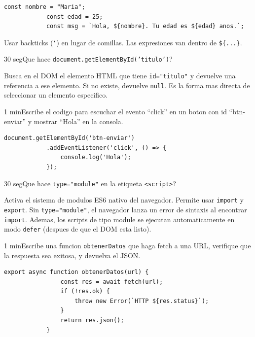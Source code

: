\documentclass[11pt,a4paper]{article}
\newcounter{nej}
\newcommand{\ej}[2]{%
	\stepcounter{nej}%
	\begin{ejercicio}{\arabic{nej}}{#1}#2\end{ejercicio}\vspace{4pt}}
\begin{document}
	\begin{respuesta}
		\begin{lstlisting}[style=codejs]
			const nombre = "Maria";
			const edad = 25;
			const msg = `Hola, ${nombre}. Tu edad es ${edad} anos.`;
		\end{lstlisting}
		Usar backticks (\texttt{`}) en lugar de comillas. Las expresiones van dentro de \texttt{\$\{...\}}.
	\end{respuesta}
	\vspace{6pt}
	
	\ej{30 seg}{Que hace \texttt{document.getElementById('titulo')}?}
	
	\begin{respuesta}
		Busca en el DOM el elemento HTML que tiene \texttt{id="titulo"} y devuelve una referencia a ese elemento. Si no existe, devuelve \texttt{null}. Es la forma mas directa de seleccionar un elemento especifico.
	\end{respuesta}
	\vspace{6pt}
	
	\ej{1 min}{Escribe el codigo para escuchar el evento ``click'' en un boton con id ``btn-enviar'' y mostrar ``Hola'' en la consola.}
	
	\begin{respuesta}
		\begin{lstlisting}[style=codejs]
			document.getElementById('btn-enviar')
			.addEventListener('click', () => {
				console.log('Hola');
			});
		\end{lstlisting}
	\end{respuesta}
	\vspace{6pt}
	
	\ej{30 seg}{Que hace \texttt{type="module"} en la etiqueta \texttt{<script>}?}
	
	\begin{respuesta}
		Activa el sistema de modulos ES6 nativo del navegador. Permite usar \texttt{import} y \texttt{export}. Sin \texttt{type="module"}, el navegador lanza un error de sintaxis al encontrar \texttt{import}. Ademas, los scripts de tipo module se ejecutan automaticamente en modo \texttt{defer} (despues de que el DOM esta listo).
	\end{respuesta}
	\vspace{6pt}
	
	\ej{1 min}{Escribe una funcion \texttt{obtenerDatos} que haga fetch a una URL, verifique que la respuesta sea exitosa, y devuelva el JSON.}
	
	\begin{respuesta}
		\begin{lstlisting}[style=codejs]
			export async function obtenerDatos(url) {
				const res = await fetch(url);
				if (!res.ok) {
					throw new Error(`HTTP ${res.status}`);
				}
				return res.json();
			}
		\end{lstlisting}
	\end{respuesta}
	\vspace{6pt}
	
\end{document}
